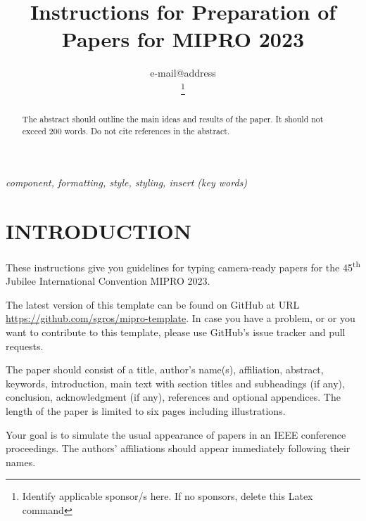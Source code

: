 \documentclass{MIPRO}
\begin{document}
\title{Instructions for Preparation of Papers for MIPRO 2023}

\author{



e-mail@address

\thanks{Identify applicable sponsor/s here. If no sponsors, delete this Latex command}
}

\maketitle

\begin{abstract}
The abstract should outline the main ideas and results of the paper. It should not exceed 200 words. Do not cite references in the abstract. 
\end{abstract}

\renewcommand\IEEEkeywordsname{Keywords}
\begin{IEEEkeywords}
\textit{component, formatting, style, styling, insert (key words)}
\end{IEEEkeywords}

\section{INTRODUCTION}

These instructions give you guidelines for typing camera‑ready papers for the 45\textsuperscript{th} Jubilee International Convention MIPRO 2023.

The latest version of this template can be found on GitHub at URL \url{https://github.com/sgros/mipro-template}. In case you have a problem, or or you want to contribute to this template, please use GitHub's issue tracker and pull requests.

The paper should consist of a title, author's name(s), affiliation, abstract, keywords, introduction, main text with section titles and subheadings (if any), conclusion, acknowledgment (if any), references and optional appendices. The length of the paper is limited to six pages including illustrations.

Your goal is to simulate the usual appearance of papers in an IEEE conference proceedings. The authors' affiliations should appear immediately following their names.
\end{document}
